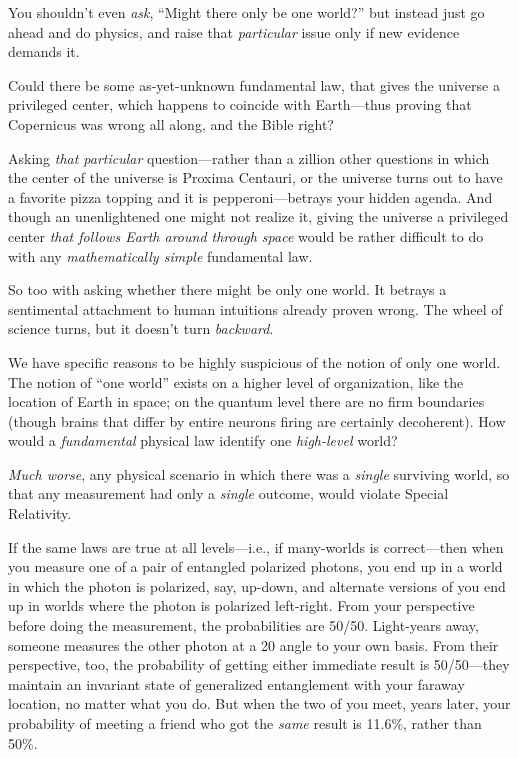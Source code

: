 {
 You shouldn't even \textit{ask},
``Might there only be one world?''
but instead just go ahead and do physics, and raise that
\textit{particular} issue only if new evidence demands it.}

{
 Could there be some as-yet-unknown fundamental law, that gives the
universe a privileged center, which happens to coincide with
Earth---thus proving that Copernicus was wrong all along, and the Bible
right?}

{
 Asking \textit{that particular} question---rather than a zillion
other questions in which the center of the universe is Proxima
Centauri, or the universe turns out to have a favorite pizza topping
and it is pepperoni---betrays your hidden agenda. And though an
unenlightened one might not realize it, giving the universe a
privileged center \textit{that follows Earth around through space}
would be rather difficult to do with any \textit{mathematically simple}
fundamental law.}

{
 So too with asking whether there might be only one world. It
betrays a sentimental attachment to human intuitions already proven
wrong. The wheel of science turns, but it doesn't turn
\textit{backward}.}

{
 We have specific reasons to be highly suspicious of the notion of
only one world. The notion of ``one
world'' exists on a higher level of organization,
like the location of Earth in space; on the quantum level there are no
firm boundaries (though brains that differ by entire neurons firing are
certainly decoherent). How would a \textit{fundamental} physical law
identify one \textit{high-level} world?}

{
 \textit{Much worse}, any physical scenario in which there was a
\textit{single} surviving world, so that any measurement had only a
\textit{single} outcome, would violate Special Relativity.}

{
 If the same laws are true at all levels---i.e., if many-worlds is
correct---then when you measure one of a pair of entangled polarized
photons, you end up in a world in which the photon is polarized, say,
up-down, and alternate versions of you end up in worlds where the
photon is polarized left-right. From your perspective before doing the
measurement, the probabilities are 50/50. Light-years away, someone
measures the other photon at a 20\degree{} angle to your own
basis. From their perspective, too, the probability of getting either
immediate result is 50/50---they maintain an invariant state of
generalized entanglement with your faraway location, no matter what you
do. But when the two of you meet, years later, your probability of
meeting a friend who got the \textit{same} result is 11.6\%, rather
than 50\%.}

